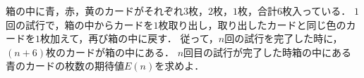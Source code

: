 \documentclass[../../main.tex]{subfiles}
\begin{document}
箱の中に青，赤，黄のカードがそれぞれ$3$枚，$2$枚，$1$枚，合計$6$枚入っている．
$1$回の試行で，箱の中からカードを$1$枚取り出し，取り出したカードと同じ色のカードを$1$枚加えて，再び箱の中に戻す．
従って，$n$回の試行を完了した時に，$(n+6)$枚のカードが箱の中にある．
$n$回目の試行が完了した時箱の中にある青のカードの枚数の期待値$E(n)$を求めよ．
\end{document}
